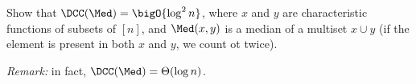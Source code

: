 Show that $\DCC(\Med) = \bigO{\log^2 n}$, where $x$ and $y$ are characteristic functions of subsets of
$[n]$, and $\Med(x, y)$ is a median of a multiset $x \cup y$ (if the element is present in both $x$ and
$y$, we count ot twice).

\textit{Remark:} in fact, $\DCC(\Med) = \Theta(\log n)$.